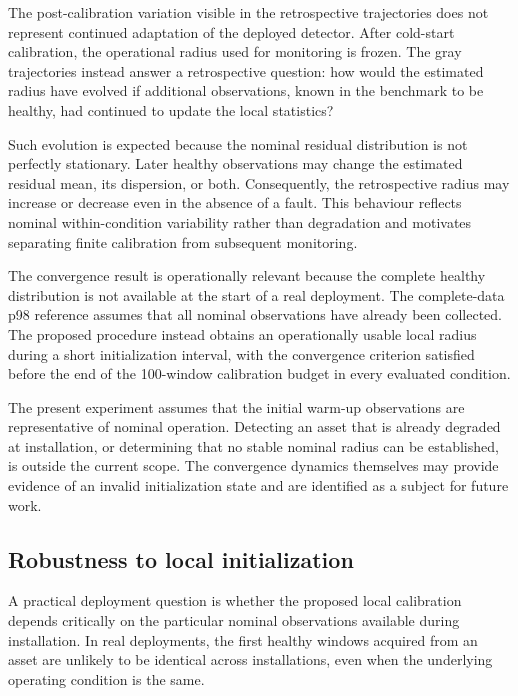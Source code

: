 \documentclass[11pt,a4paper]{article}
\begin{document}
The post-calibration variation visible in the retrospective trajectories
does not represent continued adaptation of the deployed detector. After
cold-start calibration, the operational radius used for monitoring is
frozen. The gray trajectories instead answer a retrospective question:
how would the estimated radius have evolved if additional observations,
known in the benchmark to be healthy, had continued to update the local
statistics?

Such evolution is expected because the nominal residual distribution is not
perfectly stationary. Later healthy observations may change the estimated
residual mean, its dispersion, or both. Consequently, the retrospective
radius may increase or decrease even in the absence of a fault. This
behaviour reflects nominal within-condition variability rather than
degradation and motivates separating finite calibration from subsequent
monitoring.

The convergence result is operationally relevant because the complete
healthy distribution is not available at the start of a real deployment.
The complete-data p98 reference assumes that all nominal observations have
already been collected. The proposed procedure instead obtains an
operationally usable local radius during a short initialization interval,
with the convergence criterion satisfied before the end of the 100-window
calibration budget in every evaluated condition.

The present experiment assumes that the initial warm-up observations are
representative of nominal operation. Detecting an asset that is already
degraded at installation, or determining that no stable nominal radius can
be established, is outside the current scope. The convergence dynamics
themselves may provide evidence of an invalid initialization state and are
identified as a subject for future work.

\subsection{Robustness to local initialization}
\label{sec:initialization-robustness}

A practical deployment question is whether the proposed local calibration depends critically on
the particular nominal observations available during installation. In real deployments, the first
healthy windows acquired from an asset are unlikely to be identical across installations, even
when the underlying operating condition is the same.
\end{document}
